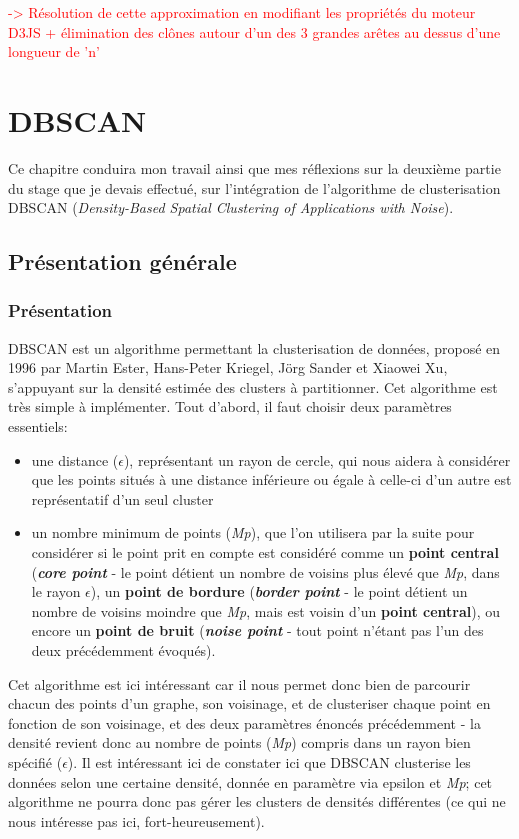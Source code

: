 \documentclass{report}
\begin{document}
\textcolor{red}{-> Résolution de cette approximation en modifiant les propriétés du moteur D3JS + élimination des clônes autour d'un des 3 grandes arêtes au dessus d'une longueur de 'n'}
\newline

\chapter{DBSCAN}

Ce chapitre conduira mon travail ainsi que mes réflexions sur la deuxième partie du stage que je devais effectué, sur l'intégration de l'algorithme de clusterisation DBSCAN (\textit{Density-Based Spatial Clustering of Applications with Noise}).

\section{Présentation générale}

\subsection{Présentation}
DBSCAN est un algorithme permettant la clusterisation de données, proposé en 1996 par Martin Ester, Hans-Peter Kriegel, Jörg Sander et Xiaowei Xu, s'appuyant sur la densité estimée des clusters à partitionner.
\newline
Cet algorithme est très simple à implémenter.
\newline
Tout d'abord, il faut choisir deux paramètres essentiels:
\begin{itemize}
\item une distance ($\epsilon$), représentant un rayon de cercle, qui nous aidera à considérer que les points situés à une distance inférieure ou égale à celle-ci d'un autre est représentatif d'un seul cluster
\item un nombre minimum de points (\textit{Mp}), que l'on utilisera par la suite pour considérer si le point prit en compte est considéré comme un \textbf{point central} (\textit{\textbf{core point}} - le point détient un nombre de voisins plus élevé que \textit{Mp}, dans le rayon $\epsilon$), un \textbf{point de bordure} (\textit{\textbf{border point}} - le point détient un nombre de voisins moindre que \textit{Mp}, mais est voisin d'un \textbf{point central}), ou encore un \textbf{point de bruit} (\textit{\textbf{noise point}} - tout point n'étant pas l'un des deux précédemment évoqués).
\end{itemize}
Cet algorithme est ici intéressant car il nous permet donc bien de parcourir chacun des points d'un graphe, son voisinage, et de clusteriser chaque point en fonction de son voisinage, et des deux paramètres énoncés précédemment - la densité revient donc au nombre de points (\textit{Mp}) compris dans un rayon bien spécifié ($\epsilon$).
\newline
Il est intéressant ici de constater ici que DBSCAN clusterise les données selon une certaine densité, donnée en paramètre via epsilon et \textit{Mp}; cet algorithme ne pourra donc pas gérer les clusters de densités différentes (ce qui ne nous intéresse pas ici, fort-heureusement).
\end{document}
